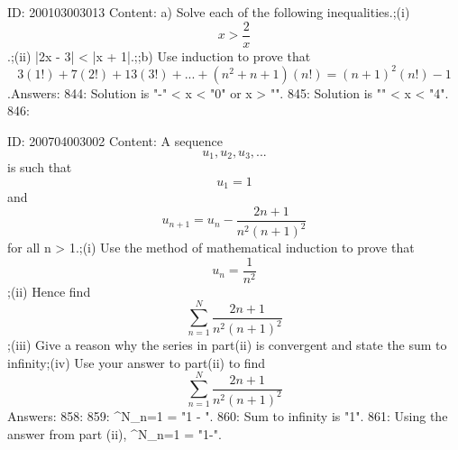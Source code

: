 \documentclass{article}
\begin{document}
ID: 200103003013
Content:
a) Solve each of the following inequalities.;(i)  $$x > \frac{2}{x}$$.;(ii) |2x - 3| < |x + 1|.;;b) Use induction to prove that  $$3( 1! ) + 7( 2! ) + 13( 3! ) + ... + ( n^2  + n + 1 )( n! ) = ( n + 1 )^2 ( n! ) - 1$$.Answers:
844: Solution is "-" < x < "0" or x > "".
845: Solution is "" < x < "4".
846: 

ID: 200704003002
Content:
A sequence $$u_1, u_2, u_3, ...$$ is such that $$u_1 = 1$$ and $$u_{n+1} = u_n - \frac{2n+1}{n^2(n+1)^2}$$ for all n > 1.;(i) Use the method of mathematical induction to prove that $$u_n = \frac{1}{n^2}$$;(ii) Hence find $$\sum^{N}_{n=1} \frac{2n+1}{n^2(n+1)^2} $$;(iii) Give a reason why the series in part(ii) is convergent and state the sum to infinity;(iv) Use your answer to part(ii) to find  $$ \sum^{N}_{n=1} \frac{2n+1}{n^2(n+1)^2} $$Answers:
858: 
859: \sum^{N}_{n=1}   = "1 - ".
860: Sum to infinity is "1".
861: Using the answer from part (ii), \sum^{N}_{n=1}   = "1-".
\end{document}
